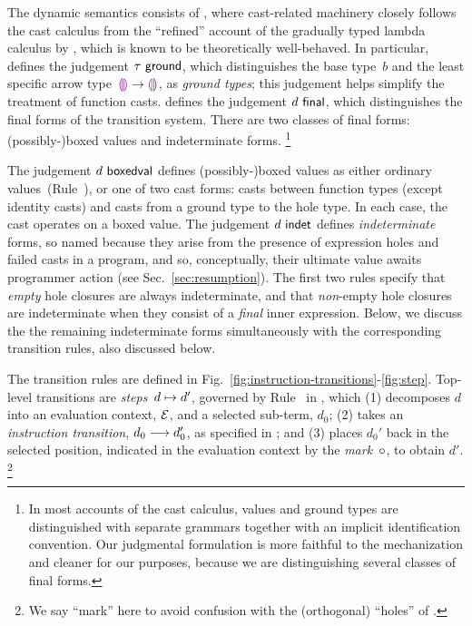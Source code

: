 The dynamic semantics consists of ,
%
where cast-related machinery closely follows the cast calculus from
the ``refined'' account of the gradually typed lambda calculus
by \citet{DBLP:conf/snapl/SiekVCB15}, which is known to be
theoretically well-behaved.
%
In particular,  defines the judgement
$\tau~\mathsf{ground}$, which distinguishes the base type~$b$ and the
least specific arrow type~$\textcolor{violet}{\llparenthesis}\textcolor{violet}{\rrparenthesis} \rightarrow \textcolor{violet}{\llparenthesis}\textcolor{violet}{\rrparenthesis}$, as \emph{ground
types}; this judgement helps simplify the treatment of function casts.
%
 defines the judgement $d~\mathsf{final}$, which
distinguishes the final forms of the transition system.
%
There are two classes of final forms: (possibly-)boxed values and
indeterminate forms.%
%
\footnote{
        In most accounts of the cast calculus, values and ground types
        are distinguished with separate grammars together with an
        implicit identification convention.
        Our judgmental formulation is more faithful to the mechanization and
        cleaner for our purposes, because we are distinguishing several
        classes of final forms.
}


The judgement $d~\mathsf{boxedval}$ defines (possibly-)boxed values as
either ordinary values~(Rule~), or one of two cast forms: casts
between function types (except identity casts) and casts from a ground
type to the hole type. In each case, the cast operates on a boxed
value.
%
%
The judgement $d~\mathsf{indet}$ defines \emph{indeterminate} forms, so
named because they arise from the presence of expression holes and
failed casts in a program, and so, conceptually, their ultimate value
awaits programmer action (see Sec.~\ref{sec:resumption}).
%
The first two rules specify that \emph{empty} hole closures are always
indeterminate, and that \emph{non}-empty hole closures are indeterminate when
they consist of a \emph{final} inner expression.
%
Below, we discuss the the remaining indeterminate forms simultaneously
with the corresponding transition rules, also discussed
below.

The transition rules are defined in Fig.~\ref{fig:instruction-transitions}-\ref{fig:step}.
%
Top-level transitions are \emph{steps}~$d \mapsto d'$, governed by Rule~ in , which
%
(1) decomposes $d$ into an evaluation context, $\mathcal{E}$, and a selected sub-term, $d_0$;
%
(2) takes an \emph{instruction transition}, $d_0 \longrightarrow d_0'$, as specified in ;
%
and (3) places $d_0'$ back in the selected position, indicated in
the evaluation context by the \emph{mark}~$\circ$, to obtain $d'$.%
\footnote{
        We say ``mark'' here to avoid confusion with the (orthogonal) ``holes'' of \HazelnutLive.
        }
%

